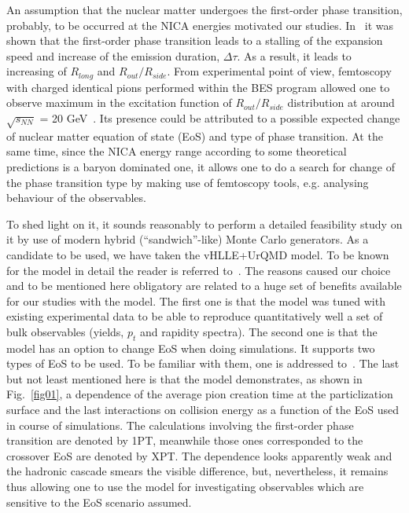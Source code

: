 \documentclass[a4paper]{panl}
\begin{document}
An assumption that the nuclear matter undergoes the first-order phase transition, probably, to be occurred at the NICA energies 
motivated our studies. In~\cite{Rischke:1996em} it was shown that the first-order phase transition leads to a stalling of the expansion 
speed and increase of the emission duration, $\Delta \tau$. As a result, it leads to increasing of $R_{long}$ and $R_{out} / R_{side}$.
From experimental point of view, femtoscopy with charged identical pions performed within the BES program allowed one to observe 
maximum in the excitation function of $R_{out} / R_{side}$ distribution at around $\sqrt{s_{NN}}$ = 20 GeV~\cite{Adamczyk:2014mxp}. 
Its presence could be attributed to a possible expected change of nuclear matter equation of state (EoS) and type of phase transition.
At the same time, since the NICA energy range according to some theoretical predictions is a baryon dominated one, it allows one 
to do a search for change of the phase transition type by making use of femtoscopy tools, e.g. analysing behaviour of the observables.

To shed light on it, it sounds reasonably to perform a detailed feasibility study on it by use of modern
hybrid (``sandwich''-like) Monte Carlo generators. As a candidate to be used, we have taken the vHLLE+UrQMD model.
To be known for the model in detail the reader is referred to~\cite{Karpenko:2015xea}. The reasons caused our choice and to be mentioned 
here obligatory are related to a huge set of benefits available for our studies with the model. The first one is that the model was tuned 
with existing experimental data to be able to reproduce quantitatively well a set of bulk observables
(yields, $p_{t}$ and rapidity spectra). The second one is that the model has an option to change EoS when doing simulations. 
It supports two types of EoS to be used. To be familiar with them, one is addressed to~\cite{Steinheimer:2010ib, Kolb:2000sd}. 
The last but not least mentioned here is that the model demonstrates, as shown in Fig.~\ref{fig01}, a dependence of the average pion 
creation time at the particlization surface and the last interactions on collision energy as a function of the EoS used
in course of simulations. The calculations involving the first-order phase transition are denoted by 1PT, meanwhile those ones corresponded 
to the crossover EoS are denoted by XPT.
The dependence looks apparently weak and the hadronic cascade smears the visible difference, but, nevertheless, it remains thus 
allowing one to use the model for investigating observables which are sensitive to the EoS scenario assumed. 
\end{document}
